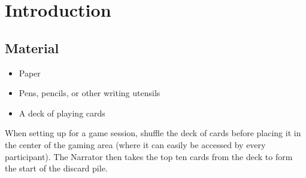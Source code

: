 \chapter{Introduction}

\section{Material}
\begin{itemize}
\item Paper
\item Pens, pencils, or other writing utensils
\item A deck of playing cards
\end{itemize}

When setting up for a game session, shuffle the deck of cards before placing it in the center of the gaming area
(where it can easily be accessed by every participant). The Narrator then takes the top ten cards from the deck
to form the start of the discard pile.

\section{}
